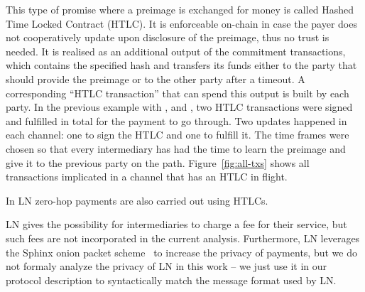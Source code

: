     This type of promise where a preimage is exchanged for money is called
    Hashed Time Locked Contract (HTLC). It is enforceable on-chain in case the
    payer does not cooperatively update upon disclosure of the preimage, thus no
    trust is needed. It is realised as an additional output of the commitment
    transactions, which contains the specified hash and transfers its funds
    either to the party that should provide the preimage or to the other party
    after a timeout. A corresponding ``HTLC transaction'' that can spend this
    output is built by each party. In the previous example with \alice{}, \bob{}
    and \charlie, two HTLC transactions were signed and fulfilled in total for
    the payment to go through. Two updates happened in each channel: one to sign
    the HTLC and one to fulfill it. The time frames were chosen so that every
    intermediary has had the time to learn the preimage and give it to the
    previous party on the path. Figure~\ref{fig:all-txs} shows all transactions
    implicated in a channel that has an HTLC in flight.

    In LN zero-hop payments are also carried out using HTLCs.

    LN gives the possibility for intermediaries to charge a fee for their
    service, but such fees are not incorporated in the current analysis.
    Furthermore, LN leverages the Sphinx onion packet scheme~\cite{sphinx} to
    increase the privacy of payments, but we do not formaly analyze the privacy
    of LN in this work -- we just use it in our protocol description to
    syntactically match the message format used by LN.
